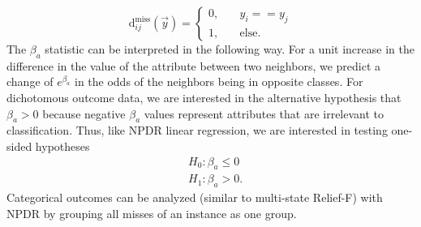 \documentclass{bioinfo}
\begin{document}
\begin{equation}\label{eq:hitdiff}
\text{d}^{\text{miss}}_{ij}(\vec{y}) = \left\{
    \begin{array}{ll}
        0, & \quad  y_{i} == y_{j} \\
        1, & \quad \text{else}.
    \end{array}
\right.
\end{equation}
The $\beta_a$ statistic can be interpreted in the following way.
For a unit increase in the difference in the value of the attribute between two neighbors, we predict a change of $e^{\beta_a}$ in the odds of the neighbors being in opposite classes.
For dichotomous outcome data, we are interested in the alternative hypothesis that $\beta_a>0$ because negative $\beta_a$ values represent attributes that are irrelevant to classification.
Thus, like NPDR linear regression, we are interested in testing one-sided hypotheses
\begin{equation}
\begin{aligned}
    & H_0: \beta_a \le 0 \\
    & H_1: \beta_a > 0.
\end{aligned}
\end{equation}
Categorical outcomes can be analyzed (similar to multi-state Relief-F) with NPDR by grouping all misses of an instance as one group.
\end{document}
